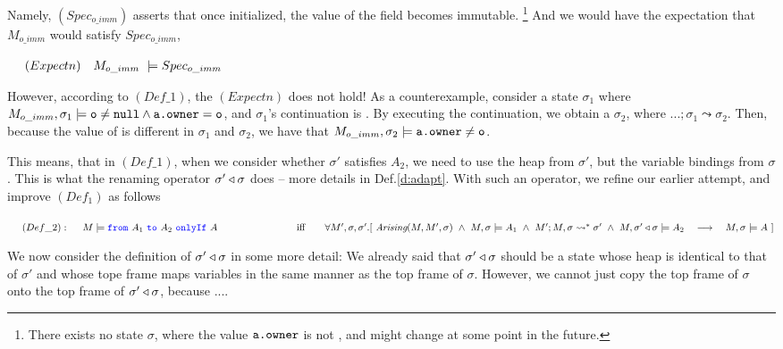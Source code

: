 {\noindent
Namely, $(Spec_{o\_imm})$ asserts that once initialized, the value of the field  becomes immutable. \footnote{There exists no state $\sigma$, where the value ${\texttt{a.owner}}$ is not , and might change at some point in the future.} And we would have the expectation that $M_{o\_imm}$ would satisfy $Spec_{o\_imm}$,

\noindent
$\strut\ \ \ \        (Expectn) \ \ \ M_{o\_imm}\ \models Spec_{o\_imm}$

\vspace{.02in}

However, according to $(Def\_1)$, the $(Expectn)$ does not hold!  
As a counterexample, consider a state $\sigma_1$ where   
$M_{o\_imm},\sigma_1 \models {\texttt{o}}\neq {\texttt{null}} \wedge {\texttt{a.owner}}={\texttt{o}}$, and 
$\sigma_1$'s continuation is . 
 By executing the continuation, 
 we obtain a $\sigma_2$, where $...;\sigma_1 \leadsto  \sigma_2$. 
 Then, because  the value of  is different in $\sigma_1$ and $\sigma_2$, 
 we have that $M_{o\_imm},\sigma_2  \models {\texttt{a.owner}}\neq{{\texttt{o}}}$.  
 
 \vspace{.02in}
 This means, that in $ (Def\_1)$, when we consider whether $\sigma'$ satisfies $A_2$, we need to use the heap from $\sigma'$, but the variable bindings from $\sigma$.
 This is what the renaming operator $\sigma' \triangleleft \sigma$   
 does -- more details in   Def.\ref{d:adapt}.   With such an operator, we refine our earlier attempt, and improve $(Def_1)$ as follows

\noindent 
$\strut\ \ \ \      (Def\_2): \\
\strut\ \ \ \   M \models \onlyIf{A_1}{A_2}{A}\\
\strut\ \ \ \ \ \ \ \  \ \ \ \ \ \ \ \  \strut\ \ \ \ \ \ \ \  \mbox{iff} \\
\strut\ \ \ \ \ \   \forall M', \sigma,\sigma'.[\  \arising{M}{M'}{\sigma}\ \wedge \ M, \sigma \models {A_1}\  \wedge\  M';M, \sigma \leadsto^* \sigma' \   \wedge \ M,  \adapt{\sigma'}{\sigma}  \models {A_2}\ \ \ \longrightarrow\  \  \  M, \sigma \models A \ ] $

 \vspace{.04in}
 
We now consider the definition of $\sigma' \triangleleft \sigma$ in some more detail:
We already said that $\sigma' \triangleleft \sigma$ should be a state whose heap is
identical to that of ${\sigma'}$ and whose tope frame maps variables in the
same manner as the top frame of $\sigma$. However, we cannot just copy the 
top frame of ${\sigma}$ onto the top frame of $\sigma' \triangleleft \sigma$, because 
....}

